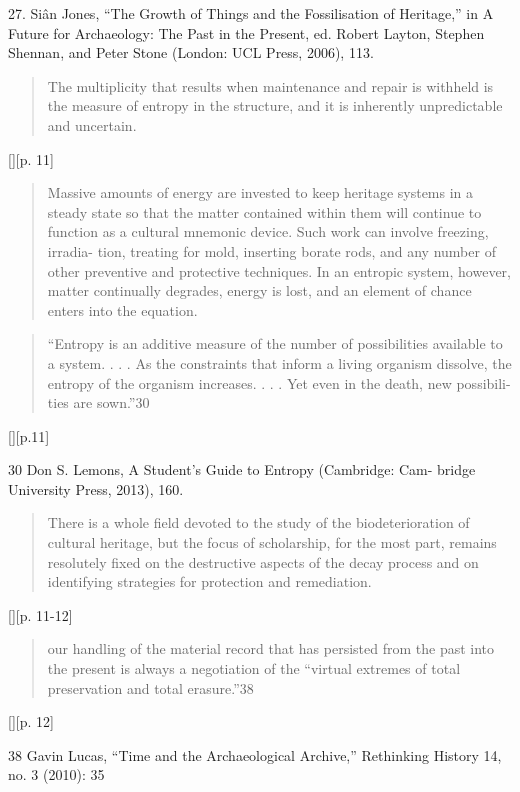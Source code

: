 27. Siân Jones, “The Growth of Things and the Fossilisation of Heritage,” in A
Future for Archaeology: The Past in the Present, ed. Robert Layton, Stephen
Shennan, and Peter Stone (London: UCL Press, 2006), 113.

\begin{quotation}
The multiplicity that results when maintenance and repair is withheld is the
measure of entropy in the structure, and it is inherently unpredictable and
uncertain.
\end{quotation}[][p. 11]

\begin{quotation}
    Massive amounts of energy are invested to keep heritage systems in a steady
    state so that the matter contained within them will continue to function as
    a cultural mnemonic device. Such work can involve freezing, irradia- tion,
    treating for mold, inserting borate rods, and any number of other preventive
    and protective techniques. In an entropic system, however, matter
    continually degrades, energy is lost, and an element of chance enters into
    the equation.
\end{quotation}

\begin{quotation}
“Entropy is an additive measure of the number of possibilities available to a
system. . . . As the constraints that inform a living organism dissolve, the
entropy of the organism increases. . . . Yet even in the death, new possibili-
ties are sown.”30 
\end{quotation}[][p.11]

30 Don S. Lemons, A Student’s Guide to Entropy (Cambridge: Cam- bridge
University Press, 2013), 160.

\begin{quotation}
    There is a whole field devoted to the study of the biodeterioration of
    cultural heritage, but the focus of scholarship, for the most part, remains
    resolutely fixed on the destructive aspects of the decay process and on
    identifying strategies for protection and remediation.
\end{quotation}[][p. 11-12]

\begin{quotation}
    our handling of the material record that has persisted from the past into
    the present is always a negotiation of the “virtual extremes of total
    preservation and total erasure.”38 
\end{quotation}[][p. 12]

38 Gavin Lucas, “Time and the Archaeological Archive,” Rethinking History 14,
no. 3 (2010): 35

